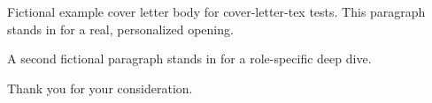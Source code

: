 Fictional example cover letter body for cover-letter-tex tests. This paragraph stands in for a real, personalized opening.

A second fictional paragraph stands in for a role-specific deep dive.

Thank you for your consideration.
